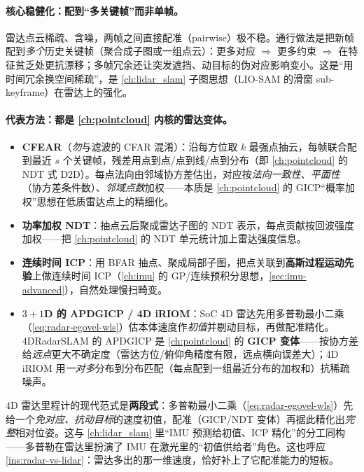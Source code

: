 \paragraph{核心稳健化：配到“多关键帧”而非单帧。}
雷达点云稀疏、含噪，两帧之间直接配准（pairwise）极不稳。通行做法是把新帧配到\emph{多个}历史关键帧（聚合成子图或一组点云）\cite{carlone2026handbook}：更多对应 $\Rightarrow$ 更多约束 $\Rightarrow$ 在特征贫乏处更抗漂移；多帧冗余还让突发遮挡、动目标的伪对应影响变小。这是“用时间冗余换空间稀疏”，是 \cref{ch:lidar_slam} 子图思想（LIO-SAM 的滑窗 sub-keyframe）在雷达上的强化。

\paragraph{代表方法：都是 \cref{ch:pointcloud} 内核的雷达变体。}
\begin{itemize}
  \item \textbf{CFEAR}\cite{carlone2026handbook}（\emph{勿}与滤波的 CFAR 混淆）：沿每方位取 $k$ 最强点抽云，每帧联合配到最近 $s$ 个关键帧，残差用点到点/点到线/点到分布（即 \cref{ch:pointcloud} 的 NDT 式 D2D）。每点法向由邻域协方差估出，对应按\emph{法向一致性}、\emph{平面性}（协方差条件数）、\emph{邻域点数}加权——本质是 \cref{ch:pointcloud} 的 GICP“概率加权”思想在低质雷达点上的精细化。
  \item \textbf{功率加权 NDT}：抽点云后聚成雷达子图的 NDT 表示，每点贡献按回波强度加权——把 \cref{ch:pointcloud} 的 NDT 单元统计加上雷达强度信息。
  \item \textbf{连续时间 ICP}：用 BFAR 抽点、聚成局部子图，把点关联到\textbf{高斯过程运动先验}上做连续时间 ICP（\cref{ch:imu} 的 GP/连续预积分思想，\cref{sec:imu-advanced}），自然处理慢扫畸变。
  \item \textbf{$3{+}1$D 的 APDGICP / 4D iRIOM}：SoC $4$D 雷达先用多普勒最小二乘（\cref{eq:radar-egovel-wls}）估本体速度作\emph{初值}并剔动目标，再做配准精化。4DRadarSLAM 的 APDGICP 是 \cref{ch:pointcloud} 的 \textbf{GICP 变体}——按协方差给\emph{远点}更大不确定度（雷达方位/俯仰角精度有限，远点横向误差大）；4D iRIOM 用\emph{一对多}分布到分布匹配（每点配到一组最近分布的加权和）抗稀疏噪声。
\end{itemize}

\begin{insight}\label{ins:radar-doppler-reg}
$4$D 雷达里程计的现代范式是\textbf{两段式}：多普勒最小二乘（\cref{eq:radar-egovel-wls}）先给一个\emph{免对应、抗动目标}的速度初值，配准（GICP/NDT 变体）再据此精化出\emph{完整}相对位姿。这与 \cref{ch:lidar_slam} 里“IMU 预测给初值、ICP 精化”的分工同构——多普勒在雷达里扮演了 IMU 在激光里的“初值供给者”角色。这也呼应 \cref{ins:radar-vs-lidar}：雷达多出的那一维速度，恰好补上了它配准能力的短板。
\end{insight}

